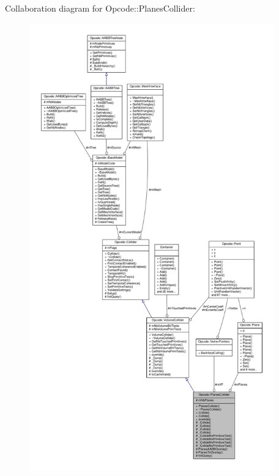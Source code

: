 Collaboration diagram for Opcode\+:\+:Planes\+Collider\+:
\nopagebreak
\begin{figure}[H]
\begin{center}
\leavevmode
\includegraphics[height=550pt]{db/daf/classOpcode_1_1PlanesCollider__coll__graph}
\end{center}
\end{figure}
